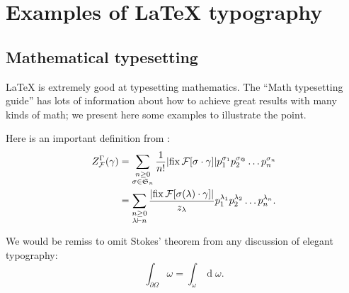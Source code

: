 \documentclass[twoside]{memoir}
\begin{document}
\chapter{Examples of \LaTeX{} typography}
\label{s:example}
\section{Mathematical typesetting}
\label{s:math}
\LaTeX{} is extremely good at typesetting mathematics.
The \enquote{Math typesetting guide} has lots of information about how to achieve great results with many kinds of math; we present here some examples to illustrate the point.

Here is an important definition from \cite[\S 4.1]{hend}:
\begin{subequations}
  \label{eq:gcidef}
  \begin{align}
    Z_{\mathcal{F}}^{\Gamma} (\gamma) &= \sum_{\substack{n \geq 0 \\ \sigma \in \mathfrak{S}_{n}}} \frac{1}{n!} \abs*{ \operatorname{fix} \mathcal{F} \sbrac{ \sigma \cdot \gamma } } p_{1}^{\sigma_{1}} p_{2}^{\sigma_{@}} \dots p_{n}^{\sigma_{n}} \label{eq:gcidefperm} \\
    &= \sum_{\substack{n \geq 0 \\ \lambda \vdash n}} \frac{\abs*{ \operatorname{fix} \mathcal{F} \sbrac{\sigma(\lambda) \cdot \gamma} }}{z_{\lambda}} p_{1}^{\lambda_{1}} p_{2}^{\lambda_{2}} \dots p_{n}^{\lambda_{n}}. \label{eq:gcidefpart}
  \end{align}
\end{subequations}

We would be remiss to omit Stokes' theorem from any discussion of elegant typography:
\begin{equation}
  \label{eq:stokes}
  \int_{\partial \Omega} \omega = \int_{\omega} \operatorname{d} \omega.
\end{equation}
\end{document}
